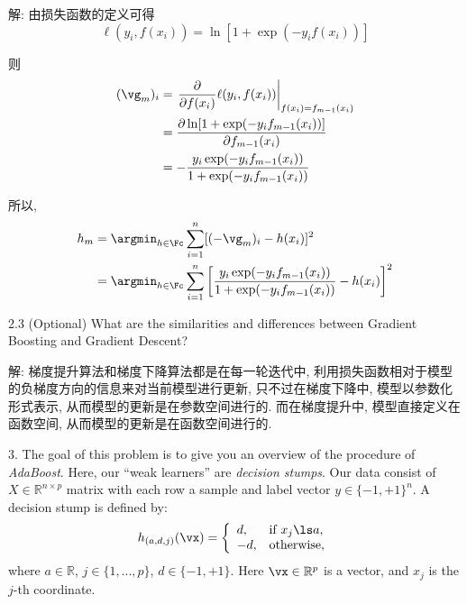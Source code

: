 \documentclass[openany]{ctexbook}
\theoremstyle{kaiti}
\theoremstyle{normal}
\begin{document}
解: 由损失函数的定义可得
\begin{equation}
  \ell(y_{i},f(x_{i}))
  =\ln[1+\exp(-y_if(x_{i}))]
\end{equation}

则
\begin{equation}
  \begin{aligned}
    ({\vg}_{m})_i
    &=\left.\frac{\partial}{\partial f(x_{i})}\ell(y_{i},f(x_{i}))\right|_{f(x_{i})=f_{m-1}(x_{i})}\\
    &=\frac{\partial\ln[1+\exp(-y_if_{m-1}(x_{i}))]}{\partial f_{m-1}(x_{i})}\\
    &=-\frac{y_i\exp(-y_if_{m-1}(x_{i}))}{1+\exp(-y_if_{m-1}(x_{i}))}\\
  \end{aligned}
\end{equation}

所以,
\begin{equation}
  \begin{aligned}
    h_{m}
    &=\argmin_{h\in\Fc}\sum_{i=1}^{n}[(-{\vg}_{m})_{i}-h(x_{i})]^{2}\\
    &=\argmin_{h\in\Fc}\sum_{i=1}^{n}\left[\frac{y_i\exp(-y_if_{m-1}(x_{i}))}{1+\exp(-y_if_{m-1}(x_{i}))}-h(x_{i})\right]^{2}\\
  \end{aligned}
\end{equation}

2.3 (Optional) What are the similarities and differences between Gradient Boosting and Gradient Descent?

解: 梯度提升算法和梯度下降算法都是在每一轮迭代中, 利用损失函数相对于模型的负梯度方向的信息来对当前模型进行更新, 只不过在梯度下降中, 模型以参数化形式表示, 从而模型的更新是在参数空间进行的. 而在梯度提升中, 模型直接定义在函数空间, 从而模型的更新是在函数空间进行的. 

3. The goal of this problem is to give you an overview of the procedure of \emph{AdaBoost}. Here, our ``weak learners'' are \emph{decision stumps}. Our data consist of $X \in \mathbb{R}^{n\times p}$ matrix with each row a sample and label vector $y\in\{-1, +1\}^{n}$. A decision stump is defined by:
\begin{equation}
  h_{(a,d,j)}(\vx)
  =\left\{\begin{array}{ll}
    d, & \text{if}\ x_{j}\ls a, \\
    -d, & \text{otherwise},
    \end{array} 
  \right.
\end{equation}
where $a\in \mathbb{R}$, $j\in \{1, ..., p\}$, $d\in \{-1, +1\}$. Here $\vx\in \mathbb{R}^{p}$ is a vector, and $x_{j}$ is the $j$-th coordinate.
\end{document}

